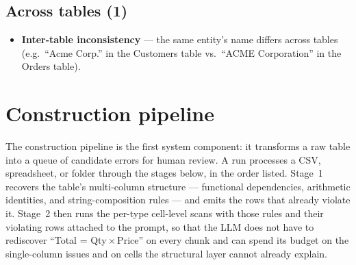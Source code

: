 \documentclass[11pt]{article}
\begin{document}
\subsection*{Across tables (1)}
\begin{itemize}
  \item \textbf{Inter-table inconsistency} --- the same entity's
    name differs across tables (e.g.\ ``Acme Corp.'' in the
    Customers table vs.\ ``ACME Corporation'' in the Orders
    table).
\end{itemize}

\section*{Construction pipeline}
The construction pipeline is the first system component: it
transforms a raw table into a queue of candidate errors for
human review. A run processes a CSV, spreadsheet, or folder
through the stages below, in the order listed. Stage~1
recovers the table's multi-column structure --- functional
dependencies, arithmetic identities, and string-composition
rules --- and emits the rows that already violate it. Stage~2
then runs the per-type cell-level scans with those rules and
their violating rows attached to the prompt, so that the
LLM does not have to rediscover ``Total = Qty\,$\times$\,Price''
on every chunk and can spend its budget on the single-column
issues and on cells the structural layer cannot already
explain.
\end{document}
